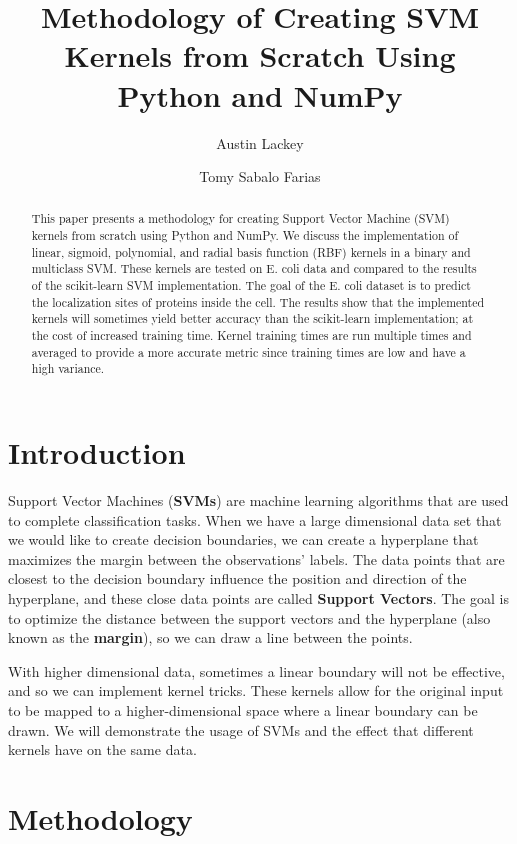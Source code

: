 \documentclass[12pt]{article}
\title{Methodology of Creating SVM Kernels from Scratch Using Python and NumPy}
\author{Austin Lackey}
\author{Tomy Sabalo Farias}
\affil{DSCI 320, Colorado State University}
\begin{document}
\maketitle

\begin{abstract}
This paper presents a methodology for creating Support Vector Machine (SVM) kernels from scratch using Python and NumPy. 
We discuss the implementation of linear, sigmoid, polynomial, and radial basis function (RBF) kernels in a binary and multiclass SVM.
These kernels are tested on E. coli data and compared to the results of the scikit-learn SVM implementation.
The goal of the E. coli dataset is to predict the localization sites of proteins inside the cell. 
The results show that the implemented kernels will sometimes yield better accuracy than the scikit-learn implementation; at the
cost of increased training time. Kernel training times are run multiple times and averaged to provide a more accurate
metric since training times are low and have a high variance.
\end{abstract}

\section{Introduction}

Support Vector Machines (\textbf{SVMs}) are machine learning algorithms that are used to complete classification tasks. When we have a large dimensional data set that we would like to create decision boundaries, we can create a hyperplane that maximizes the margin between the observations' labels. The data points that are closest to the decision boundary influence the position and direction of the hyperplane, and these close data points are called \textbf{Support Vectors}. The goal is to optimize the distance between the support vectors and the hyperplane (also known as the \textbf{margin}), so we can draw a line between the points.

With higher dimensional data, sometimes a linear boundary will not be effective, and so we can implement kernel tricks. These kernels allow for the original input to be mapped to a higher-dimensional space where a linear boundary can be drawn. We will demonstrate the usage of SVMs and the effect that different kernels have on the same data. 

\section{Methodology}
\end{document}
